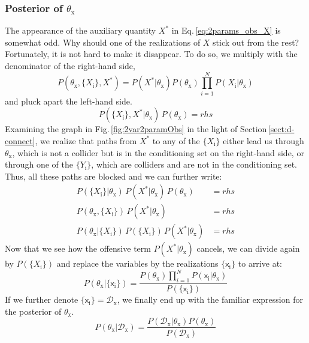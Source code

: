 \documentclass[]{report}
\begin{document}
\subsubsection{Posterior of $\theta_\mathrm{x}$}
The appearance of the auxiliary quantity $X^*$ in Eq.\,\ref{eq:2params_obs_X} is somewhat odd. Why should one of the realizations of $X$ stick out from the rest? Fortunately, it is not hard to make it disappear. To do so, we multiply with the denominator of the right-hand side,
\begin{equation}
P(\theta_\mathrm{x}, \{X_\mathrm{i}\}, X^*) = P(X^*|\theta_\mathrm{x})P(\theta_\mathrm{x})\prod_{i=1}^{N}P(X_\mathrm{i}|\theta_\mathrm{x})
\end{equation}
and pluck apart the left-hand side.
\begin{equation}
P(\{X_\mathrm{i}\}, X^*| \theta_\mathrm{x})\,P(\theta_\mathrm{x}) = rhs
\end{equation}
Examining the graph in Fig.\,\ref{fig:2var2paramObs} in the light of Section\,\ref{sect:d-connect}, we realize that paths from $X^*$ to any of the $\{X_\mathrm{i}\}$ either lead us through $\theta_\mathrm{x}$, which is not a collider but is in the conditioning set on the right-hand side, or through one of the $\{Y_\mathrm{i}\}$, which are colliders and are not in the conditioning set. Thus, all these paths are blocked and we can further write:  
\begin{align}
P(\{X_\mathrm{i}\}| \theta_\mathrm{x})\,P(X^*| \theta_\mathrm{x})\,P(\theta_\mathrm{x}) &= rhs \\ \nonumber
P(\theta_\mathrm{x}, \{X_\mathrm{i}\})\,P(X^*| \theta_\mathrm{x}) &= rhs \\
P(\theta_\mathrm{x}| \{X_\mathrm{i}\})\,P(\{X_\mathrm{i}\})\,P(X^*| \theta_\mathrm{x}) &= rhs \nonumber
\end{align}
Now that we see how the offensive term $P(X^*| \theta_\mathrm{x})$ cancels, we can divide again by $P(\{X_\mathrm{i}\})$ and replace the variables by the realizations $\{\mathsf{x}_\mathrm{i}\}$ to arrive at:
\begin{equation}
P(\theta_\mathrm{x}|\{\mathsf{x}_\mathrm{i}\}) = \frac{P(\theta_\mathrm{x})\prod_{i=1}^{N}P(\mathsf{x}_\mathrm{i}|\theta_\mathrm{x})}{P(\{\mathsf{x}_\mathrm{i}\})} 
\end{equation}
If we further denote $\{\mathsf{x}_\mathrm{i}\} = \mathcal{D}_\mathrm{x}$, we finally end up with the familiar expression for the posterior of $\theta_\mathrm{x}$.
\begin{equation}
P(\theta_\mathrm{x}|\mathcal{D}_\mathrm{x}) = \frac{P(\mathcal{D}_\mathrm{x}|\theta_\mathrm{x})P(\theta_\mathrm{x})}{P(\mathcal{D}_\mathrm{x})} 
\end{equation}
\end{document}
